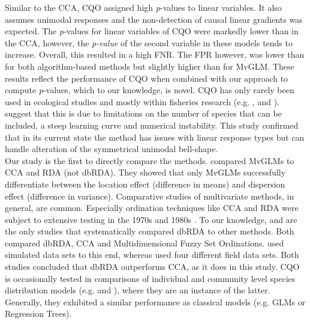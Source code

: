 \documentclass[a4paper,11pt]{article}
\begin{document}

	Similar to the CCA, CQO assigned high \textit{p}-values to linear variables. 
    It also assumes unimodal responses and the non-detection of causal linear gradients was expected. 
    The \textit{p}-values for linear variables of CQO were markedly lower than in the CCA, however, the \textit{p-value} of the second variable in these models tends to increase. 
    Overall, this resulted in a high FNR.
	The FPR however, was lower than for both algorithm-based methods but slightly higher than for MvGLM. 
	These results reflect the performance of CQO when combined with our approach to compute \textit{p}-values, which to our knowledge, is novel. 
CQO has only rarely been used in ecological studies and mostly within fisheries research (e.g. \citet{Vilizzi2012}, \citet{Top2016} and \citet{Carosi2017}). 
	\citet{TerBraak2015} suggest that this is due to limitations on the number of species that can be included, a steep learning curve and numerical instability. 
	This study confirmed that in its current state the method has issues with linear response types but can handle alteration of the symmetrical unimodal bell-shape. \\

 
 	Our study is the first to directly compare the methods. 
 \citet{Warton2012} compared MvGLMs to CCA and RDA (not dbRDA).
 	They showed that only MvGLMs successfully differentiate between the location effect (difference in means) and dispersion effect (difference in variance). 
 	Comparative studies of multivariate methods, in general, are common. 
 	Especially ordination techniques like CCA and RDA were subject to extensive testing in the 1970s and 1980s \cite[e.g.][]{GauchJr.1972, GauchJr1977, Kenkel1986}. 
 	To our knowledge, \citet{Roberts2008} and \citet{Roberts2009} are the only studies that systematically compared dbRDA to other methods. 
 	Both compared dbRDA, CCA and Multidimensional Fuzzy Set Ordinations. 
 	\citet{Roberts2008} used simulated data sets to this end, whereas \citet{Roberts2009} used four different field data sets. 
 	Both studies concluded that dbRDA outperforms CCA, as it does in this study.
 	CQO is occasionally tested in comparisons of individual and community level species distribution models (e.g. \citet{Baselga2009} and \citet{Maguire2016}),
 	where they are an instance of the latter.
 	Generally, they exhibited a similar performance as classical models (e.g. GLMs or Regression Trees). \\
\end{document}
